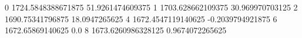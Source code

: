 0 1724.5848388671875 51.9261474609375
1 1703.628662109375 30.969970703125
2 1690.75341796875 18.0947265625
4 1672.4547119140625 -0.2039794921875
6 1672.65869140625 0.0
8 1673.6260986328125 0.9674072265625
